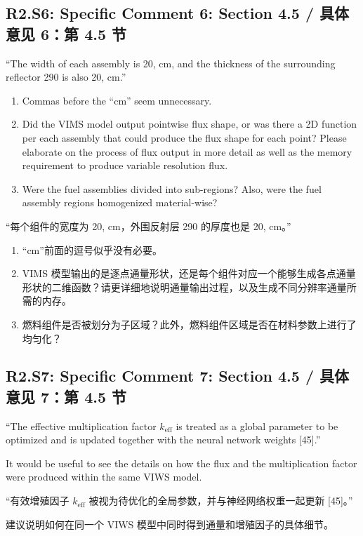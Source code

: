 \documentclass[11pt,a4paper,twoside]{article}
\begin{document}
\subsection{R2.S6: Specific Comment 6: Section 4.5 / 具体意见 6：第 4.5 节}
\begin{englishcomment}
``The width of each assembly is 20, cm, and the thickness of the surrounding reflector 290 is also 20, cm.''

\begin{enumerate}[label=\alph*.,leftmargin=2em]
\item Commas before the ``cm'' seem unnecessary.
\item Did the VIMS model output pointwise flux shape, or was there a 2D function per each assembly that could produce the flux shape for each point? Please elaborate on the process of flux output in more detail as well as the memory requirement to produce variable resolution flux.
\item Were the fuel assemblies divided into sub-regions? Also, were the fuel assembly regions homogenized material-wise?
\end{enumerate}
\end{englishcomment}
\begin{chinesecomment}
“每个组件的宽度为 20, cm，外围反射层 290 的厚度也是 20, cm。”

\begin{enumerate}[label=\alph*.,leftmargin=2em]
\item “cm”前面的逗号似乎没有必要。
\item VIMS 模型输出的是逐点通量形状，还是每个组件对应一个能够生成各点通量形状的二维函数？请更详细地说明通量输出过程，以及生成不同分辨率通量所需的内存。
\item 燃料组件是否被划分为子区域？此外，燃料组件区域是否在材料参数上进行了均匀化？
\end{enumerate}
\end{chinesecomment}
\begin{revisionidea}
\end{revisionidea}

\subsection{R2.S7: Specific Comment 7: Section 4.5 / 具体意见 7：第 4.5 节}
\begin{englishcomment}
``The effective multiplication factor $k_{\mathrm{eff}}$ is treated as a global parameter to be optimized and is updated together with the neural network weights [45].''

It would be useful to see the details on how the flux and the multiplication factor were produced within the same VIWS model.
\end{englishcomment}
\begin{chinesecomment}
“有效增殖因子 $k_{\mathrm{eff}}$ 被视为待优化的全局参数，并与神经网络权重一起更新 [45]。”

建议说明如何在同一个 VIWS 模型中同时得到通量和增殖因子的具体细节。
\end{chinesecomment}
\begin{revisionidea}
\end{revisionidea}
\end{document}
